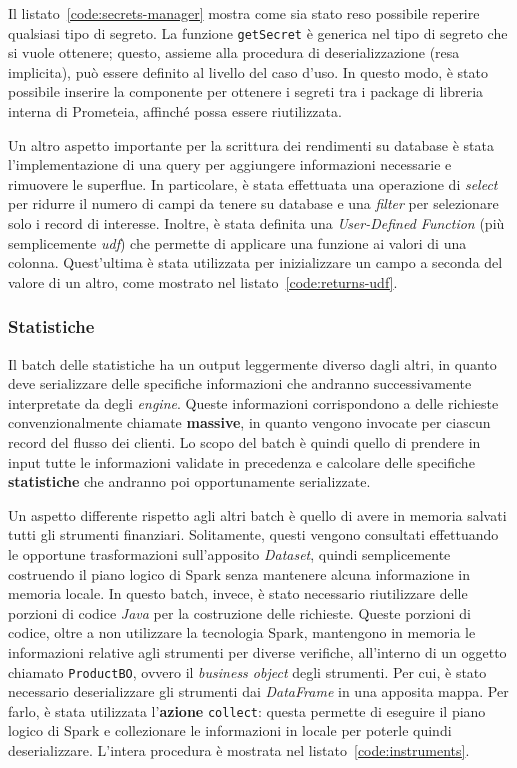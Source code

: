 Il listato~\ref{code:secrets-manager} mostra come sia stato reso possibile reperire qualsiasi tipo di segreto.
La funzione \texttt{getSecret} è generica nel tipo di segreto che si vuole ottenere;
questo, assieme alla procedura di deserializzazione (resa implicita), può essere definito al livello del caso d'uso.
In questo modo, è stato possibile inserire la componente per ottenere i segreti tra i package di libreria interna di Prometeia, affinché possa essere riutilizzata.

\clearpage


Un altro aspetto importante per la scrittura dei rendimenti su database è stata l'implementazione di una query per aggiungere informazioni necessarie e rimuovere le superflue.
In particolare, è stata effettuata una operazione di \textit{select} per ridurre il numero di campi da tenere su database e una \textit{filter} per selezionare solo i record di interesse.
Inoltre, è stata definita una \textit{User-Defined Function} (più semplicemente \textit{udf}) che permette di applicare una funzione ai valori di una colonna.
Quest'ultima è stata utilizzata per inizializzare un campo a seconda del valore di un altro, come mostrato nel listato~\ref{code:returns-udf}.

\clearpage


\subsubsection{Statistiche}\label{subsubsec:stats}
Il batch delle statistiche ha un output leggermente diverso dagli altri, in quanto deve serializzare delle specifiche informazioni che andranno successivamente interpretate da degli \textit{engine}.
Queste informazioni corrispondono a delle richieste convenzionalmente chiamate \textbf{massive}, in quanto vengono invocate per ciascun record del flusso dei clienti.
Lo scopo del batch è quindi quello di prendere in input tutte le informazioni validate in precedenza e calcolare delle specifiche \textbf{statistiche} che andranno poi opportunamente serializzate.

Un aspetto differente rispetto agli altri batch è quello di avere in memoria salvati tutti gli strumenti finanziari.
Solitamente, questi vengono consultati effettuando le opportune trasformazioni sull'apposito \textit{Dataset}, quindi semplicemente costruendo il piano logico di Spark senza mantenere alcuna informazione in memoria locale.
In questo batch, invece, è stato necessario riutilizzare delle porzioni di codice \textit{Java} per la costruzione delle richieste.
Queste porzioni di codice, oltre a non utilizzare la tecnologia Spark, mantengono in memoria le informazioni relative agli strumenti per diverse verifiche, all'interno di un oggetto chiamato \texttt{ProductBO}, ovvero il \textit{business object} degli strumenti.
Per cui, è stato necessario deserializzare gli strumenti dai \textit{DataFrame} in una apposita mappa.
Per farlo, è stata utilizzata l'\textbf{azione} \texttt{collect}:
questa permette di eseguire il piano logico di Spark e collezionare le informazioni in locale per poterle quindi deserializzare.
L'intera procedura è mostrata nel listato~\ref{code:instruments}.

